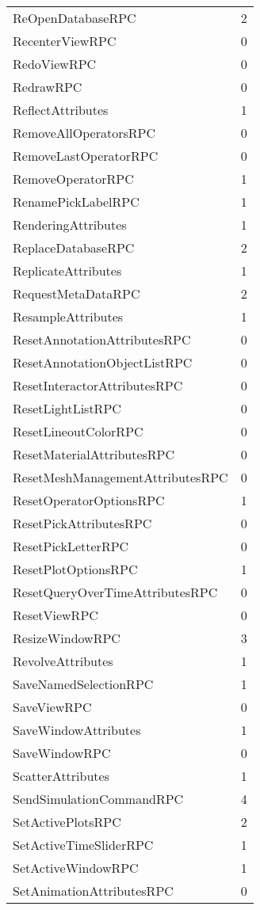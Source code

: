 \documentclass[10pt,a4paper]{report}
\begin{document}
\begin{longtable}{ll}
ReOpenDatabaseRPC & 2 \\
RecenterViewRPC & 0 \\
RedoViewRPC & 0 \\
RedrawRPC & 0 \\
ReflectAttributes & 1 \\
RemoveAllOperatorsRPC & 0 \\
RemoveLastOperatorRPC & 0 \\
RemoveOperatorRPC & 1 \\
RenamePickLabelRPC & 1 \\
RenderingAttributes & 1 \\
ReplaceDatabaseRPC & 2 \\
ReplicateAttributes & 1 \\
RequestMetaDataRPC & 2 \\
ResampleAttributes & 1 \\
ResetAnnotationAttributesRPC & 0 \\
ResetAnnotationObjectListRPC & 0 \\
ResetInteractorAttributesRPC & 0 \\
ResetLightListRPC & 0 \\
ResetLineoutColorRPC & 0 \\
ResetMaterialAttributesRPC & 0 \\
ResetMeshManagementAttributesRPC & 0 \\
ResetOperatorOptionsRPC & 1 \\
ResetPickAttributesRPC & 0 \\
ResetPickLetterRPC & 0 \\
ResetPlotOptionsRPC & 1 \\
ResetQueryOverTimeAttributesRPC & 0 \\
ResetViewRPC & 0 \\
ResizeWindowRPC & 3 \\
RevolveAttributes & 1 \\
SaveNamedSelectionRPC & 1 \\
SaveViewRPC & 0 \\
SaveWindowAttributes & 1 \\
SaveWindowRPC & 0 \\
ScatterAttributes & 1 \\
SendSimulationCommandRPC & 4 \\
SetActivePlotsRPC & 2 \\
SetActiveTimeSliderRPC & 1 \\
SetActiveWindowRPC & 1 \\
SetAnimationAttributesRPC & 0 \\

\end{longtable}
\end{document}
